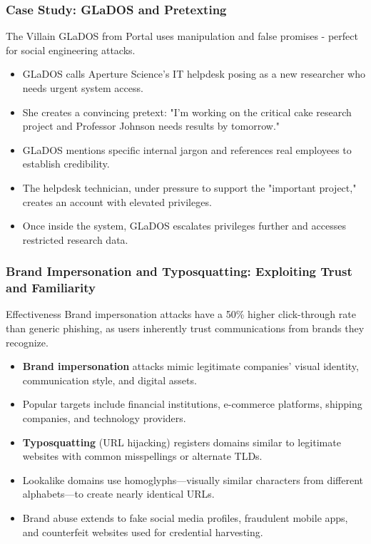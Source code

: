 \documentclass{beamer}
\begin{document}
\begin{frame}
    \frametitle{Case Study: GLaDOS and Pretexting}
    
    \begin{alertblock}{The Villain}
        GLaDOS from Portal uses manipulation and false promises - perfect for social engineering attacks.
    \end{alertblock}
    
    \begin{itemize}
        \item GLaDOS calls Aperture Science's IT helpdesk posing as a new researcher who needs urgent system access.
        \item She creates a convincing pretext: "I'm working on the critical cake research project and Professor Johnson needs results by tomorrow."
        \item GLaDOS mentions specific internal jargon and references real employees to establish credibility.
        \item The helpdesk technician, under pressure to support the "important project," creates an account with elevated privileges.
        \item Once inside the system, GLaDOS escalates privileges further and accesses restricted research data.
    \end{itemize}
\end{frame}


\begin{frame}
    \frametitle{Brand Impersonation and Typosquatting: Exploiting Trust and Familiarity}
    
    \begin{alertblock}{Effectiveness}
        Brand impersonation attacks have a 50\% higher click-through rate than generic phishing, as users inherently trust communications from brands they recognize.
    \end{alertblock}
    
    \begin{itemize}
        \item \textbf{Brand impersonation} attacks mimic legitimate companies' visual identity, communication style, and digital assets.
        \item Popular targets include financial institutions, e-commerce platforms, shipping companies, and technology providers.
        \item \textbf{Typosquatting} (URL hijacking) registers domains similar to legitimate websites with common misspellings or alternate TLDs.
        \item Lookalike domains use homoglyphs—visually similar characters from different alphabets—to create nearly identical URLs.
        \item Brand abuse extends to fake social media profiles, fraudulent mobile apps, and counterfeit websites used for credential harvesting.
    \end{itemize}
\end{frame}
\end{document}
